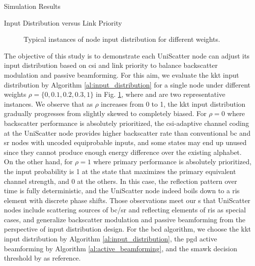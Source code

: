 \documentclass[journal]{IEEEtran}
\begin{document}
\begin{section}{Simulation Results}
	\begin{subsection}{Input Distribution versus Link Priority}
		\begin{figure}[!t]
			\centering
			\caption{Typical instances of node input distribution for different weights.}
			\label{fi:distribution_weights}
		\end{figure}
		The objective of this study is to demonstrate each UniScatter node can adjust its input distribution based on \gls{csi} and link priority to balance backscatter modulation and passive beamforming.
		For this aim, we evaluate the \gls{kkt} input distribution by Algorithm \ref{al:input_distribution} for a single node under different weights $\rho=\{0,0.1,0.2,0.3,1\}$ in Fig. \ref{fi:distribution_weights}, where  and  are two representative instances.
		We observe that as $\rho$ increases from \num{0} to \num{1}, the \gls{kkt} input distribution
		gradually progresses from slightly skewed to completely biased.
		For $\rho=0$ where backscatter performance is absolutely prioritized, the \gls{csi}-adaptive channel coding at the UniScatter node provides higher backscatter rate than conventional \gls{bc} and \gls{sr} nodes with uncoded equiprobable inputs, and some states may end up unused since they cannot produce enough energy difference over the existing alphabet.
		On the other hand, for $\rho=1$ where primary performance is absolutely prioritized, the input probability is \num{1} at the state that maximizes the primary equivalent channel strength, and \num{0} at the others.
		In this case, the reflection pattern over time is fully deterministic, and the UniScatter node indeed boils down to a \gls{ris} element with discrete phase shifts.
		Those observations meet our s that UniScatter nodes include scattering sources of \gls{bc}/\gls{sr} and reflecting elements of \gls{ris} as special cases, and generalize backscatter modulation and passive beamforming from the perspective of input distribution design.
		For the \gls{bcd} algorithm, we choose the \gls{kkt} input distribution by Algorithm \ref{al:input_distribution}, the \gls{pgd} active beamforming by Algorithm \ref{al:active_beamforming}, and the \gls{smawk} decision threshold by \cite{He2021} as reference.
	\end{subsection}


\end{section}
\end{document}

